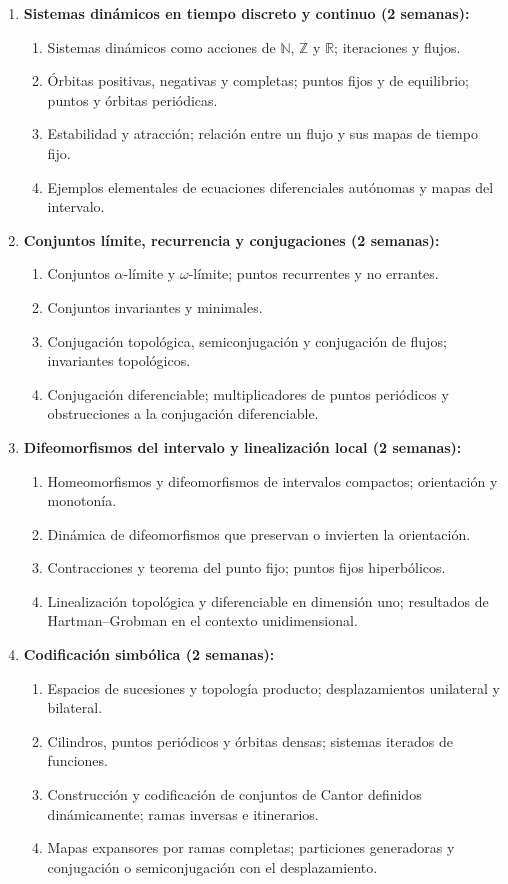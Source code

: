 \begin{refsection}
\begin{enumerate}
\item \textbf{Sistemas dinámicos en tiempo discreto y continuo (2 semanas):}
\begin{enumerate}
    \item Sistemas dinámicos como acciones de $\mathbb{N}$, $\mathbb{Z}$ y $\mathbb{R}$; iteraciones y flujos.
    \item Órbitas positivas, negativas y completas; puntos fijos y de equilibrio; puntos y órbitas periódicas.
    \item Estabilidad y atracción; relación entre un flujo y sus mapas de tiempo fijo.
    \item Ejemplos elementales de ecuaciones diferenciales autónomas y mapas del intervalo.
\end{enumerate}

\item \textbf{Conjuntos límite, recurrencia y conjugaciones (2 semanas):}
\begin{enumerate}
    \item Conjuntos $\alpha$-límite y $\omega$-límite; puntos recurrentes y no errantes.
    \item Conjuntos invariantes y minimales.
    \item Conjugación topológica, semiconjugación y conjugación de flujos; invariantes topológicos.
    \item Conjugación diferenciable; multiplicadores de puntos periódicos y obstrucciones a la conjugación diferenciable.
\end{enumerate}

\item \textbf{Difeomorfismos del intervalo y linealización local (2 semanas):}
\begin{enumerate}
    \item Homeomorfismos y difeomorfismos de intervalos compactos; orientación y monotonía.
    \item Dinámica de difeomorfismos que preservan o invierten la orientación.
    \item Contracciones y teorema del punto fijo; puntos fijos hiperbólicos.
    \item Linealización topológica y diferenciable en dimensión uno; resultados de Hartman--Grobman en el contexto unidimensional.
\end{enumerate}

\item \textbf{Codificación simbólica (2 semanas):}
\begin{enumerate}
    \item Espacios de sucesiones y topología producto; desplazamientos unilateral y bilateral.
    \item Cilindros, puntos periódicos y órbitas densas; sistemas iterados de funciones.
    \item Construcción y codificación de conjuntos de Cantor definidos dinámicamente; ramas inversas e itinerarios.
    \item Mapas expansores por ramas completas; particiones generadoras y conjugación o semiconjugación con el desplazamiento.
\end{enumerate}


\end{enumerate}
\end{refsection}

